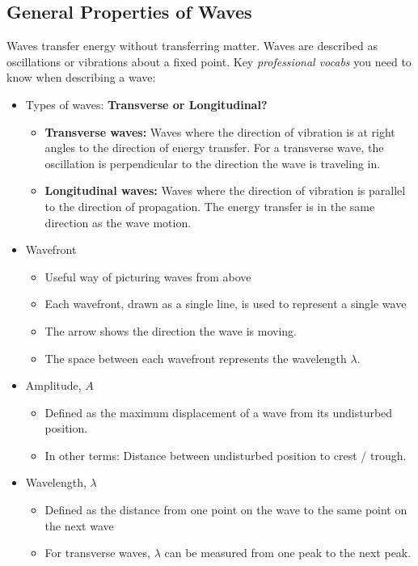 \documentclass[a4paper,12pt]{article}
\begin{document}
\subsection{General Properties of Waves}
Waves transfer energy without transferring matter. Waves are described as oscillations or vibrations about a fixed point. Key \textit{professional vocabs} you need to know when describing a wave:
\begin{itemize}
    \item Types of waves: \textbf{Transverse or Longitudinal?}
    \begin{itemize}
        \item \textbf{Transverse waves:} Waves where the direction of vibration is at right angles to the direction of energy transfer. For a transverse wave, the oscillation is perpendicular to the direction the wave is traveling in.
        \item \textbf{Longitudinal waves:} Waves where the direction of vibration is parallel to the direction of propagation. The energy transfer is in the same direction as the wave motion.
    \end{itemize}
    \item Wavefront
    \begin{itemize}
        \item Useful way of picturing waves from above
        \item Each wavefront, drawn as a single line, is used to represent a single wave
        \item The arrow shows the direction the wave is moving.
        \item The space between each wavefront represents the wavelength \(\lambda\).
    \end{itemize}
    \item Amplitude, \(A\)
    \begin{itemize}
        \item Defined as the maximum displacement of a wave from its undisturbed position.
        \item In other terms: Distance between undisturbed position to crest / trough.
    \end{itemize}
    \item Wavelength, \(\lambda\)
    \begin{itemize}
        \item Defined as the distance from one point on the wave to the same point on the next wave
        \item For transverse waves, \(\lambda\) can be measured from one peak to the next peak.

\end{itemize}
\end{itemize}
\end{document}
